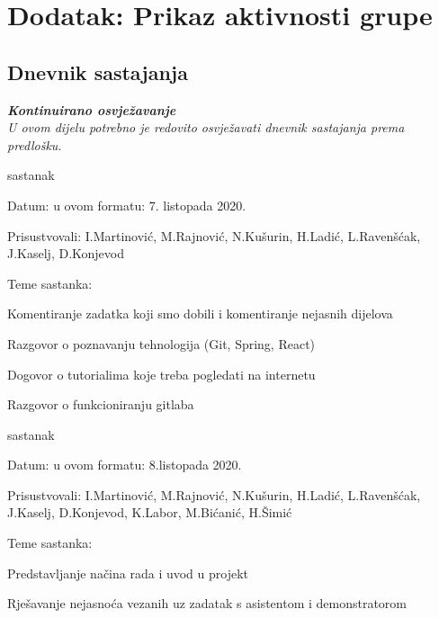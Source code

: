 \chapter*{Dodatak: Prikaz aktivnosti grupe}
		
		\section*{Dnevnik sastajanja}
		
		\textbf{\textit{Kontinuirano osvježavanje}}\\
		
		 \textit{U ovom dijelu potrebno je redovito osvježavati dnevnik sastajanja prema predlošku.}
		
		\begin{packed_enum}
			\item  sastanak
			
			\item[] \begin{packed_item}
				\item Datum: u ovom formatu: 7. listopada 2020.
				\item Prisustvovali: I.Martinović, M.Rajnović, N.Kušurin, H.Ladić, L.Ravenšćak, J.Kaselj, D.Konjevod
				\item Teme sastanka: 
				\begin{packed_item}
					\item  Komentiranje zadatka koji smo dobili i komentiranje nejasnih dijelova
					\item  Razgovor o poznavanju tehnologija (Git, Spring, React)
					\item  Dogovor o tutorialima koje treba pogledati na internetu
					\item  Razgovor o funkcioniranju gitlaba
				\end{packed_item}
			\end{packed_item}
			
			\item  sastanak
			\item[] \begin{packed_item}
				\item Datum: u ovom formatu: 8.listopada 2020.
				\item Prisustvovali: I.Martinović, M.Rajnović, N.Kušurin, H.Ladić, L.Ravenšćak, J.Kaselj, D.Konjevod, K.Labor, M.Bićanić, H.Šimić
				\item Teme sastanka:
				\begin{packed_item}
					\item   Predstavljanje načina rada i uvod u projekt
					\item   Rješavanje nejasnoća vezanih uz zadatak s asistentom i demonstratorom
				\end{packed_item}
			\end{packed_item}
		

\end{packed_enum}
